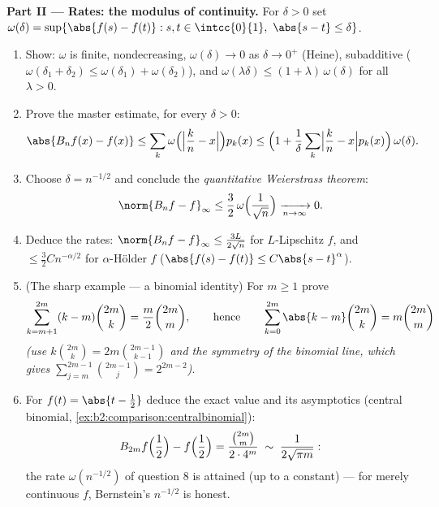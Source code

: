 \begin{problem}
\medskip
\noindent\textbf{Part II --- Rates: the modulus of continuity.}
For $\delta > 0$ set $\omega(\delta) = \sup\{\abs{f(s) - f(t)}
: s, t \in \intcc{0}{1},\ \abs{s - t} \leq \delta\}$.
\begin{enumerate}[resume]
  \item Show: $\omega$ is finite, nondecreasing,
        $\omega(\delta) \to 0$ as $\delta \to 0^+$ (Heine),
        subadditive ($\omega(\delta_1 + \delta_2) \leq
        \omega(\delta_1) + \omega(\delta_2)$), and
        $\omega(\lambda\delta) \leq (1 +
        \lambda)\,\omega(\delta)$ for all $\lambda > 0$.
  \item Prove the master estimate, for every $\delta > 0$:
        \[
        \abs{B_nf(x) - f(x)}
        \leq \sum_k \omega\Bigl(\Bigl|\frac kn -
        x\Bigr|\Bigr)p_k(x)
        \leq \Bigl(1 + \frac1\delta\sum_k\Bigl|\frac kn -
        x\Bigr|p_k(x)\Bigr)\,\omega(\delta) .
        \]
  \item Choose $\delta = n^{-1/2}$ and conclude the
        \emph{quantitative Weierstrass theorem}:
        \[
        \norm{B_nf - f}_\infty \leq
        \frac32\,\omega\Bigl(\frac{1}{\sqrt n}\Bigr)
        \xrightarrow[n\to\infty]{} 0 .
        \]
  \item Deduce the rates: $\norm{B_nf - f}_\infty \leq
        \frac{3L}{2\sqrt n}$ for $L$-Lipschitz $f$, and $\leq
        \frac32 C n^{-\alpha/2}$ for $\alpha$-H\"older $f$
        ($\abs{f(s) - f(t)} \leq C\abs{s-t}^\alpha$).
  \item (The sharp example --- a binomial identity) For $m
        \geq 1$ prove
        \[
        \sum_{k=m+1}^{2m} (k - m)\binom{2m}{k}
        = \frac{m}{2}\binom{2m}{m},
        \qquad\text{hence}\qquad
        \sum_{k=0}^{2m}\abs{k - m}\binom{2m}{k}
        = m\binom{2m}{m}
        \]
        \emph{(use $k\binom{2m}k = 2m\binom{2m-1}{k-1}$ and the
        symmetry of the binomial line, which gives
        $\sum_{j=m}^{2m-1}\binom{2m-1}{j} = 2^{2m-2}$)}.
  \item For $f(t) = \abs{t - \frac12}$ deduce the exact value
        and its asymptotics (central binomial,
        \cref{ex:b2:comparison:centralbinomial}):
        \[
        B_{2m}f\Bigl(\frac12\Bigr) - f\Bigl(\frac12\Bigr)
        = \frac{\binom{2m}{m}}{2\cdot4^{m}}
        \;\sim\; \frac{1}{2\sqrt{\pi m}} :
        \]
        the rate $\omega(n^{-1/2})$ of question 8 is attained
        (up to a constant) --- for merely continuous $f$,
        Bernstein's $n^{-1/2}$ is honest.
\end{enumerate}


\end{problem}
